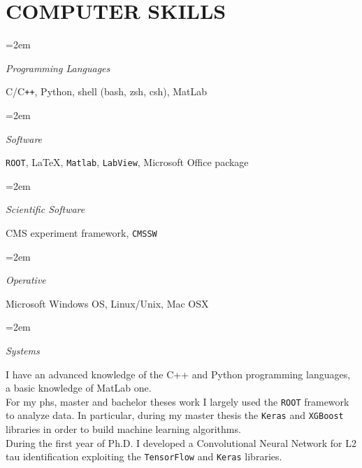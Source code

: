 \documentclass[fontsize=12pt]{article} %
\newlength{\spacebox}
\newcommand{\sepspace}{\vspace*{1em}}		%
\newcommand{\sepspacesmall}{\vspace*{0.3em}}
\newcommand{\NewPart}[1]{\section*{\uppercase{#1}}}
\newcommand{\PersonalEntry}[2]{
	\noindent\hangindent=2em\hangafter=0 %
	\vspace{0.7em}
	\parbox{\spacebox}{        %
		\footnotesize{\textit{#1}}}		       %
	\hspace{1.3em} #2 \par}    %
\newcommand{\SkillsEntry}[2]{      %
	\noindent\hangindent=2em\hangafter=0 %
	\parbox{\spacebox}{        %
		\textit{#1}}			   %
	\hspace{1.5em} #2 \par}    %
\newcommand{\EducationEntry}[4]{
	\noindent \textbf{#1} \hfill      %
	{#2} \par  %
	\noindent \textit{#3} \par        %
	\noindent\hangindent=2em\hangafter=0 \small #4 %
	\normalsize \par}
\begin{document}
     \sepspacesmall




    \sepspacesmall
	\NewPart{Computer skills}
	\SkillsEntry{Programming Languages}{C/C\texttt{++}, Python,  shell (bash, zsh, csh), MatLab}
    \sepspacesmall
	\SkillsEntry{Software}{\texttt{ROOT}, \LaTeX, \texttt{Matlab}, \texttt{LabView}, Microsoft Office package}
	\sepspace
	\SkillsEntry{Scientific Software}{CMS experiment framework, \texttt{CMSSW}}
     \sepspacesmall
	\SkillsEntry{Operative}{Microsoft Windows OS, Linux/Unix, Mac OSX}
	\SkillsEntry{Systems}{}  \vspace{2mm}
 \noindent	I have an advanced knowledge of the C++ and Python programming languages, a basic knowledge of MatLab one. \\ For my phs, master and bachelor theses work I largely used the \texttt{ROOT} framework to analyze data. In particular, during my master thesis the \texttt{Keras} and \texttt{XGBoost} libraries in order to build machine learning algorithms. \\ During the first year of Ph.D. I developed a Convolutional Neural Network for L2 tau identification exploiting the \texttt{TensorFlow} and \texttt{Keras} libraries.\\

     \sepspacesmall
\end{document}

